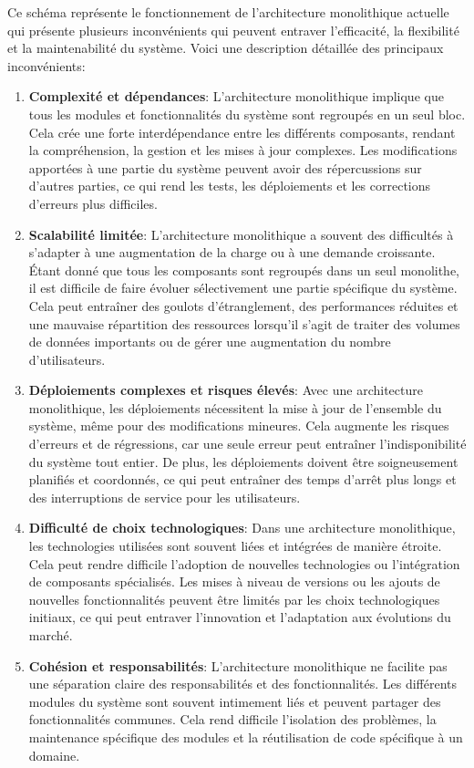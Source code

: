 Ce schéma représente le fonctionnement de l'architecture monolithique actuelle qui présente plusieurs inconvénients qui peuvent entraver l'efficacité, la flexibilité et la maintenabilité du système. Voici une description détaillée des principaux inconvénients:

\begin{enumerate}
    \item \textbf{Complexité et dépendances}: L'architecture monolithique implique que tous les modules et fonctionnalités du système sont regroupés en un seul bloc. Cela crée une forte interdépendance entre les différents composants, rendant la compréhension, la gestion et les mises à jour complexes. Les modifications apportées à une partie du système peuvent avoir des répercussions sur d'autres parties, ce qui rend les tests, les déploiements et les corrections d'erreurs plus difficiles.
    \item \textbf{Scalabilité limitée}: L'architecture monolithique a souvent des difficultés à s'adapter à une augmentation de la charge ou à une demande croissante. Étant donné que tous les composants sont regroupés dans un seul monolithe, il est difficile de faire évoluer sélectivement une partie spécifique du système. Cela peut entraîner des goulots d'étranglement, des performances réduites et une mauvaise répartition des ressources lorsqu'il s'agit de traiter des volumes de données importants ou de gérer une augmentation du nombre d'utilisateurs.
    \item \textbf{Déploiements complexes et risques élevés}: Avec une architecture monolithique, les déploiements nécessitent la mise à jour de l'ensemble du système, même pour des modifications mineures. Cela augmente les risques d'erreurs et de régressions, car une seule erreur peut entraîner l'indisponibilité du système tout entier. De plus, les déploiements doivent être soigneusement planifiés et coordonnés, ce qui peut entraîner des temps d'arrêt plus longs et des interruptions de service pour les utilisateurs.
    \item \textbf{Difficulté de choix technologiques}: Dans une architecture monolithique, les technologies utilisées sont souvent liées et intégrées de manière étroite. Cela peut rendre difficile l'adoption de nouvelles technologies ou l'intégration de composants spécialisés. Les mises à niveau de versions ou les ajouts de nouvelles fonctionnalités peuvent être limités par les choix technologiques initiaux, ce qui peut entraver l'innovation et l'adaptation aux évolutions du marché.
    \item \textbf{Cohésion et responsabilités}: L'architecture monolithique ne facilite pas une séparation claire des responsabilités et des fonctionnalités. Les différents modules du système sont souvent intimement liés et peuvent partager des fonctionnalités communes. Cela rend difficile l'isolation des problèmes, la maintenance spécifique des modules et la réutilisation de code spécifique à un domaine.
\end{enumerate}

